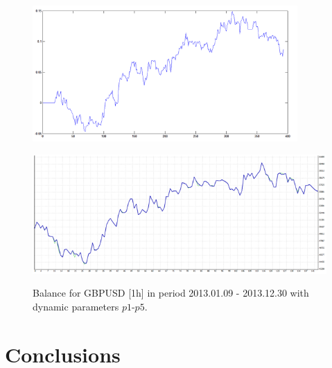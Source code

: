 \documentclass[runningheads,a4paper]{llncs}
\begin{document}
\begin{figure}[h!]
\begin{minipage}{0.49\textwidth}
\centering
\includegraphics[width = 0.9\textwidth]{figures/rys14.png}
\label{fig:fig14}
\end{minipage}
\begin{minipage}{0.49\textwidth}
\centering
\includegraphics[width = \textwidth]{figures/rys15.png}
\label{fig:fig15}
\end{minipage}
\caption{Balance for GBPUSD [1h] in period 2013.01.09 - 2013.12.30 with dynamic parameters $p1$-$p5$.}
\end{figure}
\FloatBarrier
\vspace{-1em}

\section{Conclusions}
\end{document}
